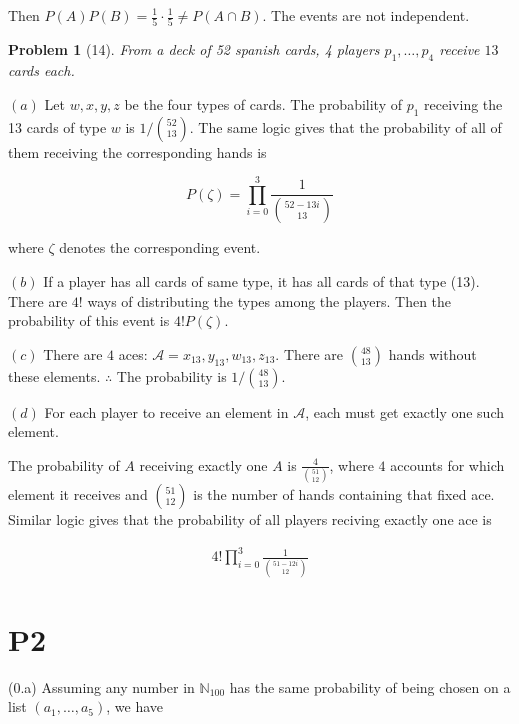 \documentclass[a4paper, 12pt]{article}
\newtheorem{problem}{Problem}
\newtheorem{problem}{Problem}
\begin{document}
  Then $P(A)P(B) = \frac{1}{5} \cdot \frac{1}{5} \neq P(A \cap B)$. The events are not independent.

\pagebreak 

\begin{problem}[14]
    From a deck of 52 spanish cards, 4 players $p_1, \ldots, p_4$ receive $13$ cards each.
\end{problem}

$(a)$ Let $w, x, y, z$ be the four types of cards. The probability of $p_1$ receiving 
the 13 cards of type $w$ is $1 / \binom{52}{13}$. The same logic gives that the probability of 
all of them receiving the corresponding hands is 

\begin{equation*}
    P(\zeta) = \prod_{i=0}^{3} \frac{1}{\binom{52 - 13i}{13}}
\end{equation*}

where $\zeta$ denotes the corresponding event.

$(b)$ If a player has all cards of same type, it has all cards of that type
(13). There are $4!$ ways of distributing the types among the players. Then the
probability of this event is $4! P(\zeta)$.

$(c)$ There are $4$ aces: $ \mathcal{A} = x_{13}, y_{13}, w_{13}, z_{13}$. There are 
$\binom{48}{13}$ hands without these elements. $\therefore $ The probability 
is $1 / \binom{48}{13}$.

$(d)$ For each player to receive an element in $\mathcal{A}$, each must get exactly 
one such element.

The probability of $A$ receiving exactly one $A$ is $\frac{4}{\binom{51}{12}}$, where 
$4$ accounts for which element it receives and $\binom{51}{12}$ is the number of 
hands containing that fixed ace. Similar logic gives that the probability of all 
players reciving exactly one ace is 

\begin{align*}
    4! \prod_{i=0}^{3} \frac{1}{\binom{51 - 12i}{12}}
\end{align*}


\pagebreak 

\section{P2}

(0.a) Assuming any number in $\mathbb{N}_{100}$ has the same probability of being chosen on a list 
$(a_1, \ldots, a_5)$, we have
\end{document}
